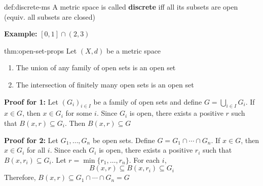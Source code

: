 \documentclass[landscape, 8pt]{extarticle}
\begin{document}
\begin{multicols}{3}
%
%
%

\begin{dfn}{def:discrete-ms}{}
    A metric space is called \textbf{discrete} iff all its subsets are open (equiv. all subsets are closed)
\end{dfn}

\textbf{Example:} $[0,1]\cap (2,3)$

\begin{thm}{thm:open-set-props}{}
    Let $(X,d)$ be a metric space
    \begin{enumerate}
        \item The union of any family of open sets is an open set
        \item The intersection of finitely many open sets is an open set
    \end{enumerate}
\end{thm}

\textbf{Proof for 1:} Let $(G_{i})_{i\in I}$ be a family of open sets and define $G = \bigcup_{i\in I} G_{i}$. If $x\in G$, then $x\in G_{i}$ for some $i$. Since $G_{i}$ is open, there exists a positive $r$ such that $B(x,r)\subseteq G_{i}$. Then $B(x,r)\subseteq G$


\textbf{Proof for 2:} Let $G_{1}, \dots, G_{n}$ be open sets. Define $G = G_{1} \cap \cdots \cap G_{n}$. If $x\in G$, then $x\in G_{i}$ for all $i$. Since each $G_{i}$ is open, there exists a positive $r_{i}$ such that $B(x,r_{i})\subseteq G_{i}$. Let $r = \min \{r_{1},\dots,r_{n}\}$. For each $i$,
\[B(x,r)\subseteq B(x,r_{i})\subseteq G_{i}\]
Therefore, $B(x,r)\subseteq G_{1} \cap \cdots \cap G_{n} = G$


\end{multicols}
\end{document}
